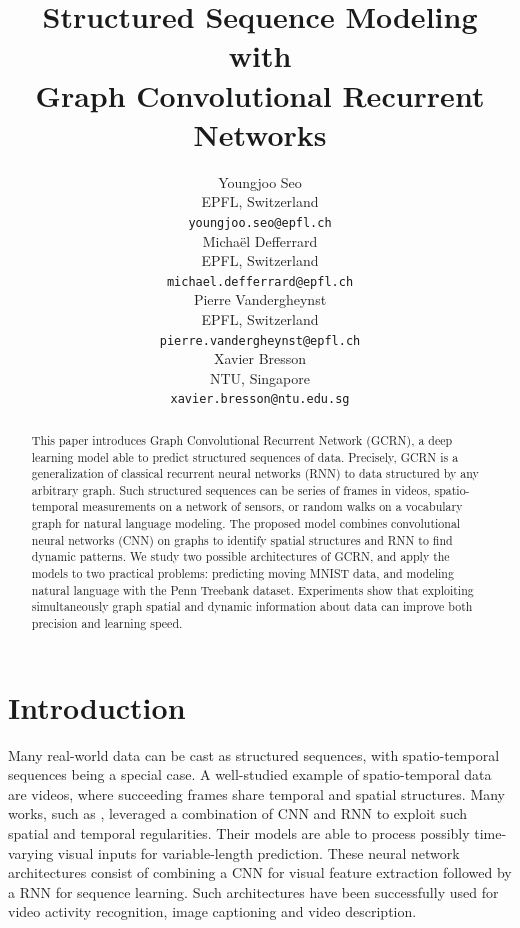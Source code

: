 \documentclass{article} %
\title{Structured Sequence Modeling with \\ Graph Convolutional Recurrent Networks}
\author{
Youngjoo Seo \\
EPFL, Switzerland \\
\texttt{youngjoo.seo@epfl.ch} \\
\And
Michaël Defferrard \\
EPFL, Switzerland \\
\texttt{michael.defferrard@epfl.ch} \\
\And
Pierre Vandergheynst \\
EPFL, Switzerland \\
\texttt{pierre.vandergheynst@epfl.ch} \\
\And
Xavier Bresson \\
NTU, Singapore \\
\texttt{xavier.bresson@ntu.edu.sg} 
}
\begin{document}
\maketitle

\begin{abstract}
	This paper introduces Graph Convolutional Recurrent
	Network (GCRN), a deep learning model able to predict structured
	sequences of data. Precisely, GCRN is a generalization of classical recurrent neural networks (RNN) to
	data structured by any arbitrary graph. 
	Such structured sequences can be series of frames in videos, spatio-temporal measurements on a network of
	sensors, or random walks on a vocabulary graph for natural language modeling.
	The proposed model combines convolutional neural networks (CNN) on graphs to identify spatial structures and RNN to find dynamic patterns. We study two possible architectures of GCRN, and apply the models to two practical
	problems: predicting moving MNIST data, and modeling natural language with the Penn
	Treebank dataset. Experiments show that exploiting simultaneously graph spatial and dynamic information about data can improve both precision and learning speed.
\end{abstract}

	

\section{Introduction}


Many real-world data can be cast as structured sequences, with spatio-temporal
sequences being a special case. A well-studied example of spatio-temporal data are videos, where
succeeding frames share temporal and spatial structures. Many works, such as \citet{cnnlstm1, cnnlstm2, cnnlstm3},  leveraged a combination of CNN and RNN to exploit such spatial and
temporal regularities. Their models are able to process possibly time-varying
visual inputs for variable-length prediction. These neural network architectures consist of combining
a CNN for visual feature extraction followed by a RNN for sequence learning. Such
architectures have been successfully used for video activity recognition, image
captioning and video description.
\end{document}
